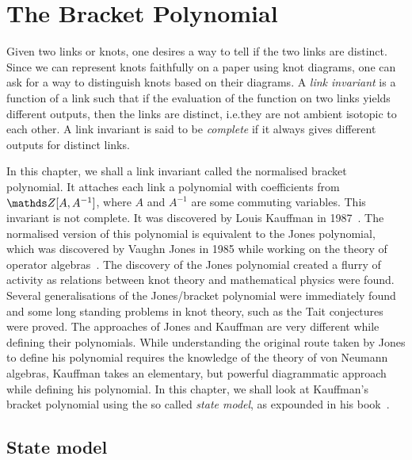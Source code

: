\chapter{The Bracket Polynomial}

Given two links or knots, one desires a way to tell if the two links are distinct. Since we can represent knots faithfully on a paper using knot diagrams, one can ask for a way to distinguish knots based on their diagrams. A \textit{link invariant} is a function of a link such that if the evaluation of the function on two links yields different outputs, then the links are distinct, i.e.\@ they are not ambient isotopic to each other. A link invariant is said to be \textit{complete} if it always gives different outputs for distinct links.

In this chapter, we shall a link invariant called the normalised bracket polynomial. It attaches each link a polynomial with coefficients from \(\Z[A, A^{-1}]\), where \(A\) and \(A^{-1}\) are some commuting variables. This invariant is not complete. It was discovered by Louis Kauffman in 1987~\cite{kauffmanstate1987, kauffmaninvariant}. The normalised version of this polynomial is equivalent to the Jones polynomial, which was discovered by Vaughn Jones in 1985 while working on the theory of operator algebras~\cite{jones}. The discovery of the Jones polynomial created a flurry of activity as relations between knot theory and mathematical physics were found. Several generalisations of the Jones/bracket polynomial were immediately found and some long standing problems in knot theory, such as the Tait conjectures were proved. The approaches of Jones and Kauffman are very different while defining their polynomials. While understanding the original route taken by Jones to define his polynomial requires the knowledge of the theory of von Neumann algebras, Kauffman takes an elementary, but powerful diagrammatic approach while defining his polynomial. In this chapter, we shall look at Kauffman's bracket polynomial using the so called \textit{state model}, as expounded in his book~\cite{kauffman}.

\section{State model}

